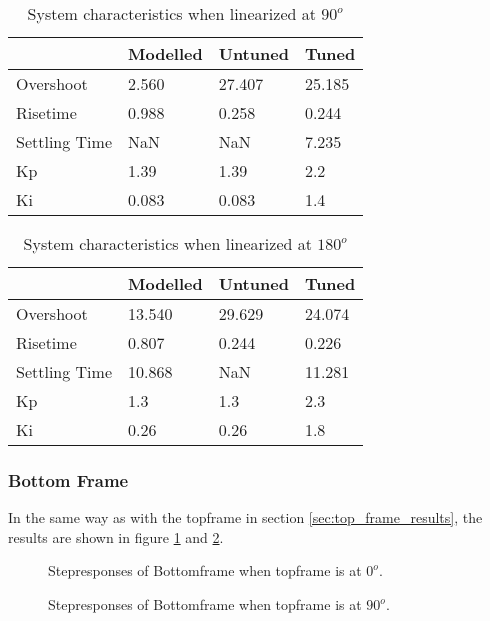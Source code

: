 \documentclass[../../Main]{subfiles}
\begin{document}
\begin{table}[H]
	\centering
	\begin{tabular}{l|*{3}{l}}
		&Modelled&Untuned&Tuned\\
		\hline
		Overshoot&2.560&27.407&25.185\\
		Risetime&0.988&0.258&0.244\\
		Settling Time&NaN&NaN&7.235\\
		Kp&1.39&1.39&2.2\\
		Ki&0.083&0.083&1.4
	\end{tabular}
	\caption{System characteristics when linearized at $90^o$}
	\label{tab:90_top}
\end{table}


\begin{table}[H]
	\centering
	\begin{tabular}{l|*{3}{l}}
		&Modelled&Untuned&Tuned\\
		\hline
		Overshoot&13.540&29.629&24.074\\
		Risetime&0.807&0.244&0.226\\
		Settling Time&10.868&NaN&11.281\\
		Kp&1.3&1.3&2.3\\
		Ki&0.26&0.26&1.8
	\end{tabular}
	\caption{System characteristics when linearized at $180^o$}
	\label{tab:180_top}
\end{table}



\subsubsection{Bottom Frame}%
\label{sec:bottom_frame_results}

In the same way as with the topframe in section \ref{sec:top_frame_results}, the results are shown in figure \ref{fig:bot_0} and \ref{fig:bot_90}.

\begin{figure}[H]
  \def\svgwidth{\textwidth}
  
  \caption{Stepresponses of Bottomframe when topframe is at $0^o$.}
  \label{fig:bot_0}
\end{figure}

\begin{figure}[H]
 \def\svgwidth{\textwidth}
 
  \caption{Stepresponses of Bottomframe when topframe is at $90^o$.}
  \label{fig:bot_90}
\end{figure}
\end{document}
